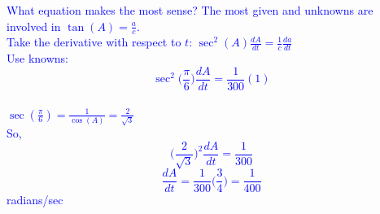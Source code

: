 \documentclass{ximera}
\begin{document}
\begin{exercise}
\textcolor{blue}{
%
What equation makes the most sense?  The most given and unknowns are involved in $\tan(A)=\frac{a}{c}$.\\
Take the derivative with respect to $t$: $\sec^2(A)\frac{dA}{dt}=\frac{1}{c}\frac{da}{dt}$\\
Use knowns:\\
$$\sec^2\bigg(\frac{\pi}{6}\bigg)\frac{dA}{dt}=\frac{1}{300}(1)$$\\
%
$\sec(\frac{\pi}{6})=\frac{1}{\cos(A)}=\frac{2}{\sqrt{3}}$\\
So, $$\bigg(\frac{2}{\sqrt{3}}\bigg)^2\frac{dA}{dt}=\frac{1}{300}$$
$$\frac{dA}{dt}=\frac{1}{300}\bigg(\frac{3}{4}\bigg)=\frac{1}{400}$$ radians/sec}
\end{exercise}
\end{document}
